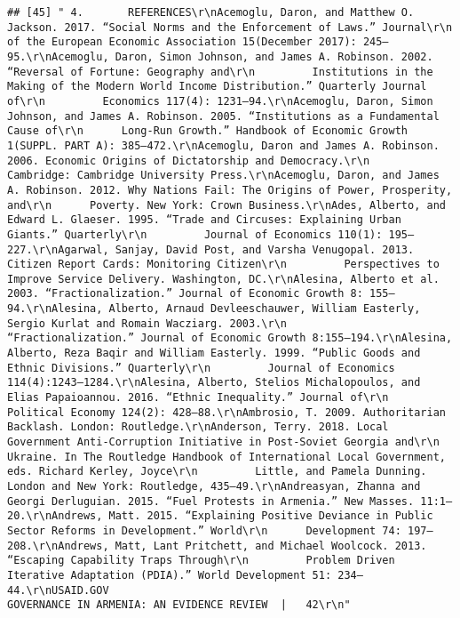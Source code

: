 \documentclass[
]{article}
\begin{document}
\begin{verbatim}
## [45] " 4.       REFERENCES\r\nAcemoglu, Daron, and Matthew O. Jackson. 2017. “Social Norms and the Enforcement of Laws.” Journal\r\n      of the European Economic Association 15(December 2017): 245–95.\r\nAcemoglu, Daron, Simon Johnson, and James A. Robinson. 2002. “Reversal of Fortune: Geography and\r\n         Institutions in the Making of the Modern World Income Distribution.” Quarterly Journal of\r\n         Economics 117(4): 1231–94.\r\nAcemoglu, Daron, Simon Johnson, and James A. Robinson. 2005. “Institutions as a Fundamental Cause of\r\n      Long-Run Growth.” Handbook of Economic Growth 1(SUPPL. PART A): 385–472.\r\nAcemoglu, Daron and James A. Robinson. 2006. Economic Origins of Dictatorship and Democracy.\r\n         Cambridge: Cambridge University Press.\r\nAcemoglu, Daron, and James A. Robinson. 2012. Why Nations Fail: The Origins of Power, Prosperity, and\r\n      Poverty. New York: Crown Business.\r\nAdes, Alberto, and Edward L. Glaeser. 1995. “Trade and Circuses: Explaining Urban Giants.” Quarterly\r\n         Journal of Economics 110(1): 195–227.\r\nAgarwal, Sanjay, David Post, and Varsha Venugopal. 2013. Citizen Report Cards: Monitoring Citizen\r\n         Perspectives to Improve Service Delivery. Washington, DC.\r\nAlesina, Alberto et al. 2003. “Fractionalization.” Journal of Economic Growth 8: 155–94.\r\nAlesina, Alberto, Arnaud Devleeschauwer, William Easterly, Sergio Kurlat and Romain Wacziarg. 2003.\r\n         “Fractionalization.” Journal of Economic Growth 8:155–194.\r\nAlesina, Alberto, Reza Baqir and William Easterly. 1999. “Public Goods and Ethnic Divisions.” Quarterly\r\n         Journal of Economics 114(4):1243–1284.\r\nAlesina, Alberto, Stelios Michalopoulos, and Elias Papaioannou. 2016. “Ethnic Inequality.” Journal of\r\n         Political Economy 124(2): 428–88.\r\nAmbrosio, T. 2009. Authoritarian Backlash. London: Routledge.\r\nAnderson, Terry. 2018. Local Government Anti-Corruption Initiative in Post-Soviet Georgia and\r\n         Ukraine. In The Routledge Handbook of International Local Government, eds. Richard Kerley, Joyce\r\n         Little, and Pamela Dunning. London and New York: Routledge, 435–49.\r\nAndreasyan, Zhanna and Georgi Derluguian. 2015. “Fuel Protests in Armenia.” New Masses. 11:1–20.\r\nAndrews, Matt. 2015. “Explaining Positive Deviance in Public Sector Reforms in Development.” World\r\n      Development 74: 197–208.\r\nAndrews, Matt, Lant Pritchett, and Michael Woolcock. 2013. “Escaping Capability Traps Through\r\n         Problem Driven Iterative Adaptation (PDIA).” World Development 51: 234–44.\r\nUSAID.GOV                                                  GOVERNANCE IN ARMENIA: AN EVIDENCE REVIEW  |   42\r\n"                                                                                                                                                                                                                                                                                                                                                                                                                                                                                                                                                                                                                            
\end{verbatim}
\end{document}
